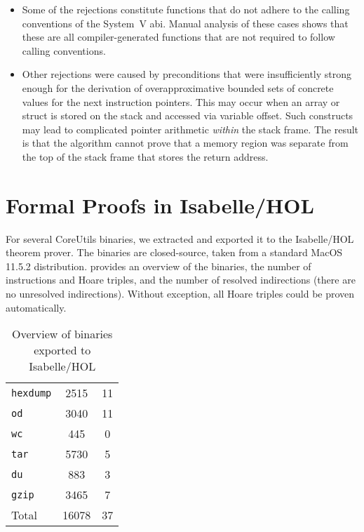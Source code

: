 \begin{itemize}
  \item Some of the rejections constitute functions that do not adhere to the calling conventions of the System~V \ac{abi}.
  Manual analysis of these cases shows that these are all compiler-generated functions that are not required to follow calling conventions.
  \item Other rejections were caused by preconditions that were insufficiently strong enough for the derivation of overapproximative bounded sets of concrete values for the next instruction pointers.
  This may occur when an array or struct is stored on the stack and accessed via variable offset.
  Such constructs may lead to complicated pointer arithmetic \emph{within} the stack frame.
  The result is that the algorithm cannot prove that a memory region was separate from the top of the stack frame that stores the return address.
\end{itemize}

\section{Formal Proofs in Isabelle/HOL}\label{sec:not-me-proofs}
For several CoreUtils binaries, we extracted  and exported it to the Isabelle/HOL theorem prover.
The binaries are closed-source, taken from a standard MacOS 11.5.2 distribution.
 provides an overview of the binaries, the number of instructions and Hoare triples, and the number of resolved indirections (there are no unresolved indirections).
Without exception, all Hoare triples could be proven automatically.

\begin{table}
  \centering
  \caption{Overview of binaries exported to Isabelle/HOL}
  \label{tab:isa}
  \begin{tabular}{lSS}
    \toprule
     & {} & {}\\
    \midrule
    \texttt{hexdump} & 2515 & 11 \\
    \texttt{od}      & 3040 & 11 \\
    \texttt{wc}      &  445 &  0 \\
    \texttt{tar}     & 5730 & 5 \\
    \texttt{du}      &  883 & 3\\
    \texttt{gzip}    & 3465 & 7\\
    \midrule
    Total            & 16078 & 37 \\
    \bottomrule
  \end{tabular}
\end{table}

